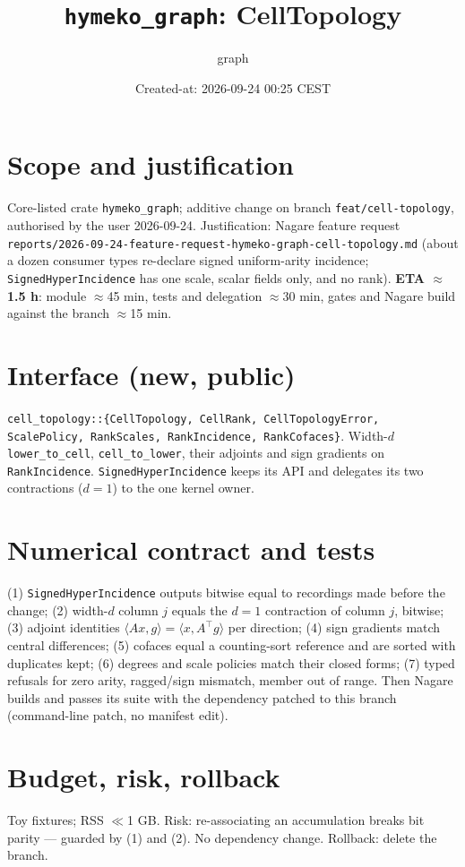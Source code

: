 \documentclass[10pt,a4paper]{article}
\title{\texttt{hymeko\_graph}: CellTopology}\author{graph}\date{Created-at: 2026-09-24 00:25 CEST}
\begin{document}
\maketitle
\section{Scope and justification}
Core-listed crate \texttt{hymeko\_graph}; additive change on branch \texttt{feat/cell-topology},
authorised by the user 2026-09-24. Justification: Nagare feature request
\texttt{reports/2026-09-24-feature-request-hymeko-graph-cell-topology.md} (about a dozen consumer types
re-declare signed uniform-arity incidence; \texttt{SignedHyperIncidence} has one scale, scalar
fields only, and no rank). \textbf{ETA $\approx$1.5 h}: module $\approx$45 min, tests and delegation
$\approx$30 min, gates and Nagare build against the branch $\approx$15 min.
\section{Interface (new, public)}
\texttt{cell\_topology::\{CellTopology, CellRank, CellTopologyError, ScalePolicy, RankScales,
RankIncidence, RankCofaces\}}. Width-$d$ \texttt{lower\_to\_cell}, \texttt{cell\_to\_lower}, their
adjoints and sign gradients on \texttt{RankIncidence}. \texttt{SignedHyperIncidence} keeps its API and
delegates its two contractions ($d=1$) to the one kernel owner.
\section{Numerical contract and tests}
(1) \texttt{SignedHyperIncidence} outputs bitwise equal to recordings made before the change;
(2) width-$d$ column $j$ equals the $d=1$ contraction of column $j$, bitwise;
(3) adjoint identities $\langle Ax,g\rangle=\langle x,A^\top g\rangle$ per direction;
(4) sign gradients match central differences; (5) cofaces equal a counting-sort reference and are
sorted with duplicates kept; (6) degrees and scale policies match their closed forms; (7) typed
refusals for zero arity, ragged/sign mismatch, member out of range. Then Nagare builds and passes
its suite with the dependency patched to this branch (command-line patch, no manifest edit).
\section{Budget, risk, rollback}
Toy fixtures; RSS $\ll$1 GB. Risk: re-associating an accumulation breaks bit parity --- guarded by (1)
and (2). No dependency change. Rollback: delete the branch.
\begin{figure}[h]\centering\end{figure}
\end{document}
